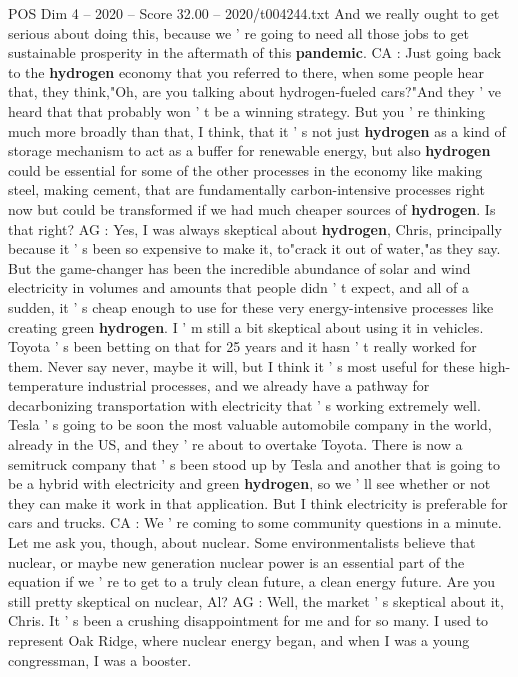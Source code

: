 \begin{textsample}{POS Dim 4 – 2020 – Score 32.00 – 2020/t004244.txt}
And we really ought to get serious about doing this, because we ' re going to need all those jobs to get sustainable prosperity in the aftermath of this \textbf{pandemic}.
CA : Just going back to the \textbf{hydrogen} economy that you referred to there, when some people hear that, they think,"Oh, are you talking about hydrogen-fueled cars?"And they ' ve heard that that probably won ' t be a winning strategy.
But you ' re thinking much more broadly than that, I think, that it ' s not just \textbf{hydrogen} as a kind of storage mechanism to act as a buffer for renewable energy, but also \textbf{hydrogen} could be essential for some of the other processes in the economy like making steel, making cement, that are fundamentally carbon-intensive processes right now but could be transformed if we had much cheaper sources of \textbf{hydrogen}.
Is that right?
AG : Yes, I was always skeptical about \textbf{hydrogen}, Chris, principally because it ' s been so expensive to make it, to"crack it out of water,"as they say.
But the game-changer has been the incredible abundance of solar and wind electricity in volumes and amounts that people didn ' t expect, and all of a sudden, it ' s cheap enough to use for these very energy-intensive processes like creating green \textbf{hydrogen}.
I ' m still a bit skeptical about using it in vehicles.
Toyota ' s been betting on that for 25 years and it hasn ' t really worked for them.
Never say never, maybe it will, but I think it ' s most useful for these high-temperature industrial processes, and we already have a pathway for decarbonizing transportation with electricity that ' s working extremely well.
Tesla ' s going to be soon the most valuable automobile company in the world, already in the US, and they ' re about to overtake Toyota.
There is now a semitruck company that ' s been stood up by Tesla and another that is going to be a hybrid with electricity and green \textbf{hydrogen}, so we ' ll see whether or not they can make it work in that application.
But I think electricity is preferable for cars and trucks.
CA : We ' re coming to some community questions in a minute.
Let me ask you, though, about nuclear.
Some environmentalists believe that nuclear, or maybe new generation nuclear power is an essential part of the equation if we ' re to get to a truly clean future, a clean energy future.
Are you still pretty skeptical on nuclear, Al?
AG : Well, the market ' s skeptical about it, Chris.
It ' s been a crushing disappointment for me and for so many.
I used to represent Oak Ridge, where nuclear energy began, and when I was a young congressman, I was a booster.

\end{textsample}
